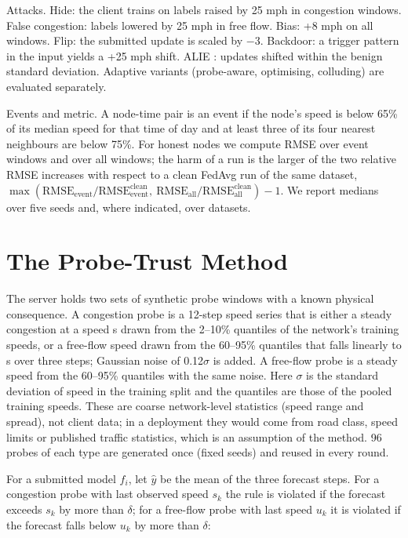 \documentclass[journal]{IEEEtran}
\begin{document}
Attacks. Hide: the client trains on labels raised by 25 mph in congestion windows. False congestion: labels lowered by 25 mph in free flow. Bias: +8 mph on all windows. Flip: the submitted update is scaled by \ensuremath{-}3. Backdoor: a trigger pattern in the input yields a +25 mph shift. ALIE \cite{alie}: updates shifted within the benign standard deviation. Adaptive variants (probe-aware, optimising, colluding) are evaluated separately.

Events and metric. A node-time pair is an event if the node's speed is below 65\% of its median speed for that time of day and at least three of its four nearest neighbours are below 75\%. For honest nodes we compute RMSE over event windows and over all windows; the harm of a run is the larger of the two relative RMSE increases with respect to a clean FedAvg run of the same dataset, $\max(\mathrm{RMSE}_{\mathrm{event}}/\mathrm{RMSE}^{\mathrm{clean}}_{\mathrm{event}},\ \mathrm{RMSE}_{\mathrm{all}}/\mathrm{RMSE}^{\mathrm{clean}}_{\mathrm{all}})-1$. We report medians over five seeds and, where indicated, over datasets.

\section{The Probe-Trust Method}
The server holds two sets of synthetic probe windows with a known physical consequence. A congestion probe is a 12-step speed series that is either a steady congestion at a speed s drawn from the 2--10\% quantiles of the network's training speeds, or a free-flow speed drawn from the 60--95\% quantiles that falls linearly to s over three steps; Gaussian noise of 0.12\ensuremath{\sigma} is added. A free-flow probe is a steady speed from the 60--95\% quantiles with the same noise. Here \ensuremath{\sigma} is the standard deviation of speed in the training split and the quantiles are those of the pooled training speeds. These are coarse network-level statistics (speed range and spread), not client data; in a deployment they would come from road class, speed limits or published traffic statistics, which is an assumption of the method. 96 probes of each type are generated once (fixed seeds) and reused in every round.

For a submitted model $f_{i}$, let \ensuremath{\hat{y}} be the mean of the three forecast steps. For a congestion probe with last observed speed $s_{k}$ the rule is violated if the forecast exceeds $s_{k}$ by more than \ensuremath{\delta}; for a free-flow probe with last speed $u_{k}$ it is violated if the forecast falls below $u_{k}$ by more than \ensuremath{\delta}:
\end{document}
